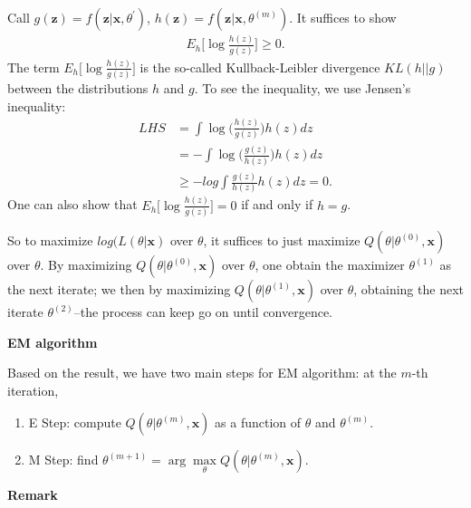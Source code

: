 \documentclass[
  14pt,
]{article}
\providecommand{\tightlist}{%
  \setlength{\itemsep}{0pt}\setlength{\parskip}{0pt}}
\begin{document}
Call
\(g(\boldsymbol{z}) = f(\boldsymbol{z}|\boldsymbol{x},\theta^{'})\),
\(h(\boldsymbol{z}) = f(\boldsymbol{z}|\boldsymbol{x},\theta^{(m)})\).
It suffices to show \begin{align*}
  E_{h}\Big[\log\frac{h(z)}{g(z)}\Big] \ge 0. 
\end{align*} The term \(E_{h}\Big[\log\frac{h(z)}{g(z)}\Big]\) is the
so-called Kullback-Leibler divergence \(KL(h||g)\) between the
distributions \(h\) and \(g\). To see the inequality, we use Jensen's
inequality:\\
\begin{align*}
  LHS & = \int \log \Big(\frac{h(z)}{g(z)}\Big) h(z) dz \\
      & = -\int \log \Big(\frac{g(z)}{h(z)}\Big) h(z) dz \\
      & \ge - log \int \frac{g(z)}{h(z)}h(z) dz = 0. 
\end{align*} One can also show that
\(E_{h}\Big[\log\frac{h(z)}{g(z)}\Big] =0\) if and only if \(h=g\).

So to maximize \(log(L(\theta|\boldsymbol{x})\) over \(\theta\), it
suffices to just maximize \(Q(\theta | \theta^{(0)},\boldsymbol{x})\)
over \(\theta\). By maximizing
\(Q(\theta | \theta^{(0)},\boldsymbol{x})\) over \(\theta\), one obtain
the maximizer \(\theta^{(1)}\) as the next iterate; we then by
maximizing \(Q(\theta | \theta^{(1)},\boldsymbol{x})\) over \(\theta\),
obtaining the next iterate \(\theta^{(2)}\)--the process can keep go on
until convergence.

\textbf{EM algorithm}

Based on the result, we have two main steps for EM algorithm: at the
\(m\)-th iteration,

\begin{enumerate}
\def\labelenumi{(\arabic{enumi})}
\tightlist
\item
  E Step: compute \(Q(\theta |\theta^{(m)},\boldsymbol{x})\) as a
  function of \(\theta\) and \(\theta^{(m)}\).\\
\item
  M Step: find
  \(\theta^{(m+1)} = \arg\max\limits_{\theta} Q(\theta |\theta^{(m)},\boldsymbol{x})\).
\end{enumerate}

\textbf{Remark}
\end{document}
